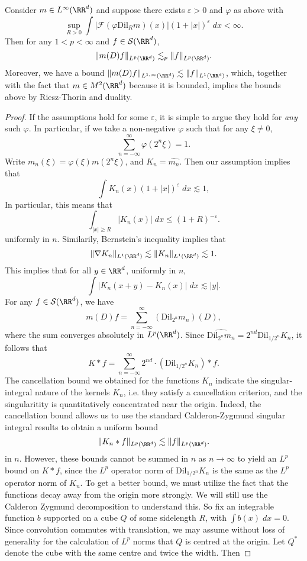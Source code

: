 \begin{theorem}
    Consider $m \in L^\infty(\RR^d)$ and suppose there exists $\varepsilon > 0$ and $\varphi$ as above with
    \[ \sup_{R > 0} \int |\mathcal{F}( \varphi \text{Dil}_R m)(x)| (1 + |x|)^{\varepsilon}\; dx < \infty.  \]
    Then for any $1 < p < \infty$ and $f \in \mathcal{S}(\RR^d)$,
    \[ \| m(D) f \|_{L^p(\RR^d)} \lesssim_p \| f \|_{L^p(\RR^d)}. \]
    Moreover, we have a bound $\| m(D) f \|_{L^{1,\infty}(\RR^d)} \lesssim \| f \|_{L^1(\RR^d)}$, which, together with the fact that $m \in M^2(\RR^d)$ because it is bounded, implies the bounds above by Riesz-Thorin and duality.
\end{theorem}
\begin{proof}
  If the assumptions hold for some $\varepsilon$, it is simple to argue they hold for \emph{any} such $\varphi$. In particular, if we take a non-negative $\varphi$ such that for any $\xi \neq 0$,
  \[ \sum_{n = -\infty}^\infty \varphi(2^n \xi) = 1. \]
  Write $m_n(\xi) = \varphi(\xi) m(2^n \xi)$, and $K_n = \widehat{m_n}$. Then our assumption implies that
  \[ \int K_n(x) (1 + |x|)^\varepsilon\; dx \lesssim 1, \]
  In particular, this means that
  \[ \int_{|x| \geq R} |K_n(x)|\; dx \leq (1 + R)^{-\varepsilon}. \]
  uniformly in $n$. Similarily, Bernstein's inequality implies that
  \[ \| \nabla K_n \|_{L^1(\RR^d)} \lesssim \| K_n \|_{L^1(\RR^d)} \lesssim 1. \]
  This implies that for all $y \in \RR^d$, uniformly in $n$,
  \[ \int |K_n(x + y) - K_n(x)|\; dx \lesssim |y|. \]
  For any $f \in \mathcal{S}(\RR^d)$, we have
  \[ m(D) f = \sum_{n = -\infty}^\infty (\text{Dil}_{2^n} m_n)(D), \]
  where the sum converges absolutely in $L^p(\RR^d)$. Since $\widehat{\text{Dil}_{2^n} m_n} = 2^{nd} \text{Dil}_{1/2^n} K_n$, it follows that
  \[ K * f = \sum_{n = -\infty}^\infty 2^{nd} \cdot (\text{Dil}_{1/2^n} K_n) * f. \]
  The cancellation bound we obtained for the functions $K_n$ indicate the singular-integral nature of the kernels $K_n$, i.e. they satisfy a cancellation criterion, and the singularitity is quantitatively concentrated near the origin. Indeed, the cancellation bound allows us to use the standard Calderon-Zygmund singular integral results to obtain a uniform bound
  \[ \| K_n * f \|_{L^p(\RR^d)} \lesssim \| f \|_{L^p(\RR^d)}. \]
  in $n$. However, these bounds cannot be summed in $n$ as $n \to \infty$ to yield an $L^p$ bound on $K * f$, since the $L^p$ operator norm of $\text{Dil}_{1/2^n} K_n$ is the same as the $L^p$ operator norm of $K_n$. To get a better bound, we must utilize the fact that the functions decay away from the origin more strongly. We will still use the Calderon Zygmund decomposition to understand this. So fix an integrable function $b$ supported on a cube $Q$ of some sidelength $R$, with $\int b(x)\; dx = 0$. Since convolution commutes with translation, we may assume without loss of generality for the calculation of $L^p$ norms that $Q$ is centred at the origin. Let $Q^*$ denote the cube with the same centre and twice the width. Then

\end{proof}
